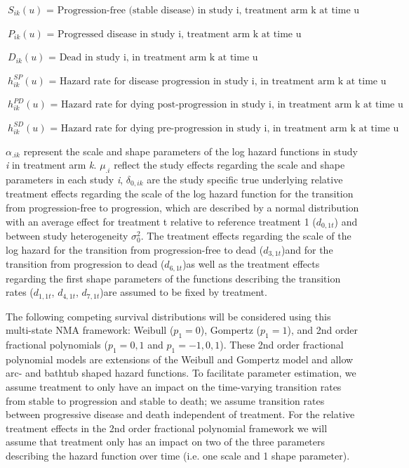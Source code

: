 \documentclass[11pt,final,fleqn]{article}\usepackage[]{graphicx}\usepackage[]{color}
\theoremstyle{plain}
\begin{document}
{\begin{appendices}
$\ S_{ik} (u) \textrm{ = Progression-free (stable disease) in study i, treatment arm k at time u }$

$\ P_{ik} (u) \textrm{ = Progressed disease in study i, treatment arm k at time u }$

$\ D_{ik} (u) \textrm{ = Dead in study i, in treatment arm k at time u }$

$\ h_{ik}^{SP} (u) \textrm{ = Hazard rate for disease progression in study i, in treatment arm k at time u }$

$\ h_{ik}^{PD} (u) \textrm{ = Hazard rate for dying post-progression in study i, in treatment arm k at time u }$

$\ h_{ik}^{SD} (u) \textrm{ = Hazard rate for dying pre-progression in study i, in treatment arm k at time u}$

$\alpha_{.ik} $ represent the scale and shape parameters of the log hazard functions in study \textit{i} in treatment arm \textit{k}. $\mu_{.i} $ reflect the study effects regarding the scale and shape parameters in each study \textit{i}, $\delta_{0,ik} $ are the study specific true underlying relative treatment effects regarding the scale of the log hazard function for the transition from progression-free to progression, which are described by a normal distribution with an average effect for treatment t relative to reference treatment 1 (${d_{0,1t}}$) and between study heterogeneity $\sigma_{0}^{2} $. The treatment effects regarding the scale of the log hazard for the transition from progression-free to dead (${d_{3,1t}}$)and for the transition from progression to dead (${d_{6,1t}}$)as well as the treatment effects regarding the first shape parameters of the functions describing the transition rates (${d_{1,1t}}$, $d_{4,1t}$, $d_{7,1t}$)are assumed to be fixed by treatment.

The following competing survival distributions will be considered using this multi-state NMA framework: Weibull ($p_{1}=0$), Gompertz ($p_{1}=1$), and 2nd order fractional polynomials ($p_{1}={0,1}$ and $p_{1}={-1,0,1}$). These 2nd order fractional polynomial models are extensions of the Weibull and Gompertz model and allow arc- and bathtub shaped hazard functions. To facilitate parameter estimation, we assume treatment to only have an impact on the time-varying transition rates from stable to progression and stable to death; we assume transition rates between progressive disease and death independent of treatment. For the relative treatment effects in the 2nd order fractional polynomial framework we will assume that treatment only has an impact on two of the three parameters describing the hazard function over time (i.e. one scale and 1 shape parameter).


\end{appendices}}
\end{document}

